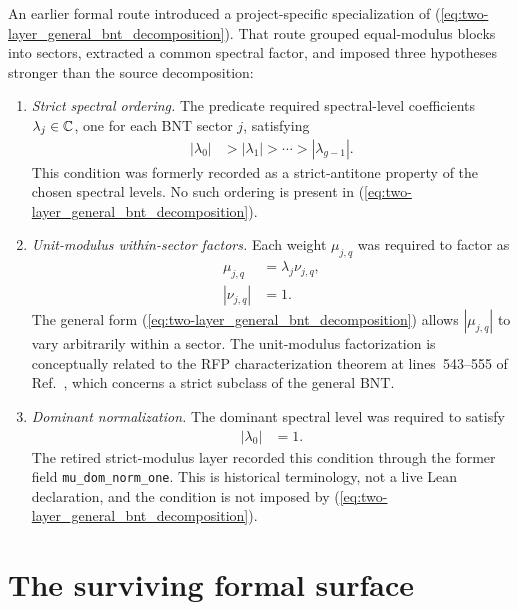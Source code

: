 \documentclass{article}
\begin{document}
An earlier formal route introduced a project-specific specialization of
(\ref{eq:two-layer_general_bnt_decomposition}). That route grouped
equal-modulus blocks into sectors, extracted a common spectral factor, and
imposed three hypotheses stronger than the source decomposition:
\begin{enumerate}
    \item \emph{Strict spectral ordering.}
    The predicate required spectral-level coefficients
    $\lambda_j\in\mathbb{C}$, one for each BNT sector $j$, satisfying
    \begin{align}
        |\lambda_0|
            &>|\lambda_1|>\cdots>|\lambda_{g-1}|.
        \label{eq:two-layer_strict_spectral_order}
    \end{align}
    This condition was formerly recorded as a strict-antitone property of the
    chosen spectral levels. No such ordering is present in
    (\ref{eq:two-layer_general_bnt_decomposition}).

    \item \emph{Unit-modulus within-sector factors.}
    Each weight $\mu_{j,q}$ was required to factor as
    \begin{align}
        \mu_{j,q}
            &=\lambda_j\nu_{j,q},
        \label{eq:two-layer_weight_factorization}\\
        |\nu_{j,q}|
            &=1.
        \label{eq:two-layer_unit_modulus_factor}
    \end{align}
    The general form
    (\ref{eq:two-layer_general_bnt_decomposition}) allows
    $|\mu_{j,q}|$ to vary arbitrarily within a sector. The unit-modulus
    factorization is conceptually related to the RFP characterization theorem
    at lines~543--555 of Ref.~\cite{Cirac2016MPDO_arXiv}, which concerns a
    strict subclass of the general BNT.

    \item \emph{Dominant normalization.}
    The dominant spectral level was required to satisfy
    \begin{align}
        |\lambda_0|
            &=1.
        \label{eq:two-layer_dominant_normalization}
    \end{align}
    The retired strict-modulus layer recorded this condition through the former
    field \texttt{mu\_dom\_norm\_one}. This is historical terminology, not a
    live Lean declaration, and the condition is not imposed by
    (\ref{eq:two-layer_general_bnt_decomposition}).
\end{enumerate}

\section{The surviving formal surface}
\end{document}

